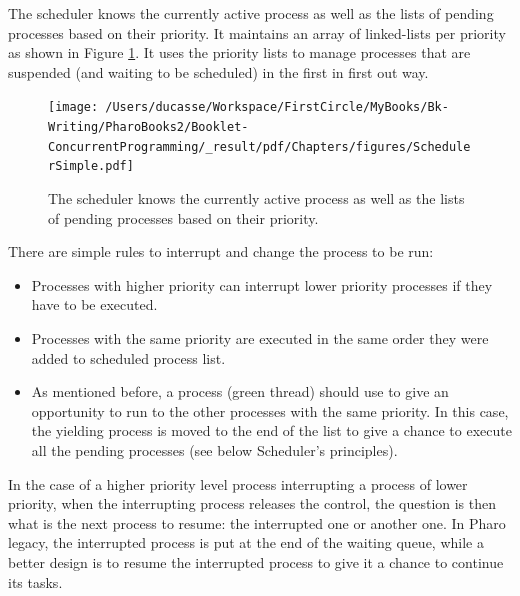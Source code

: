 \documentclass[10pt,twoside,english]{_support/latex/sbabook/sbabook}
\begin{document}
The scheduler knows the currently active process as well as the lists of pending processes based on their priority.
It maintains an array of linked-lists per priority as shown in Figure \ref{SchedulerSimple}.
It uses the priority lists to manage processes that are suspended (and waiting to be scheduled) in the first in first out way.


\begin{figure}

\begin{center}
\texttt{[image: /Users/ducasse/Workspace/FirstCircle/MyBooks/Bk-Writing/PharoBooks2/Booklet-ConcurrentProgramming/\_result/pdf/Chapters/figures/SchedulerSimple.pdf]}\caption{The scheduler knows the currently active process as well as the lists of pending processes based on their priority.\label{SchedulerSimple}}\end{center}
\end{figure}


There are simple rules to interrupt and change the process to be run:

\begin{itemize}
\item Processes with higher priority can interrupt lower priority processes if they have to be executed. 
\end{itemize}

\begin{itemize}
\item Processes with the same priority are executed in the same order they were added to scheduled process list.
\end{itemize}

\begin{itemize}
\item As mentioned before, a process (green thread) should use  to give an opportunity to run to the other processes with the same priority. In this case, the  yielding process is moved to the end of the list to give a chance to execute all the pending processes (see below Scheduler's principles).
\end{itemize}

\begin{note}
In the case of a higher priority level process interrupting a process of lower priority, when the interrupting process releases the control, the question is then what is the next process to resume: the interrupted one or another one. In Pharo legacy, the interrupted process is put at the end of the waiting queue, while a better design is to resume the interrupted process to give it a chance to continue its tasks.
\end{note}
\end{document}
